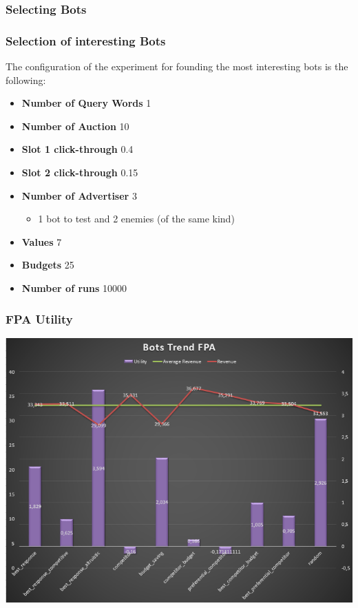 \documentclass{beamer}
\begin{document}
\subsubsection{Selecting Bots}
\begin{frame}
\frametitle{Selection of interesting Bots}
The configuration of the experiment for founding the most interesting bots is the following:
\begin{itemize}
\item \textbf{Number of Query Words} 1
\item \textbf{Number of Auction} 10
\item \textbf{Slot 1 click-through } 0.4
\item \textbf{Slot 2 click-through } 0.15
\item \textbf{Number of Advertiser} 3
\begin{itemize}
\item 1 bot to test and 2 enemies (of the same kind)
\end{itemize}
\item \textbf{Values} 7
\item \textbf{Budgets}  25
\item \textbf{Number of runs } 10000
\end{itemize}
\end{frame}

\begin{frame}
\frametitle{FPA Utility}
\begin{center}\includegraphics[scale=0.46]{img/Auctions/FPA_all_Utility.PNG} 
\end{center}
\end{frame}
\end{document}
